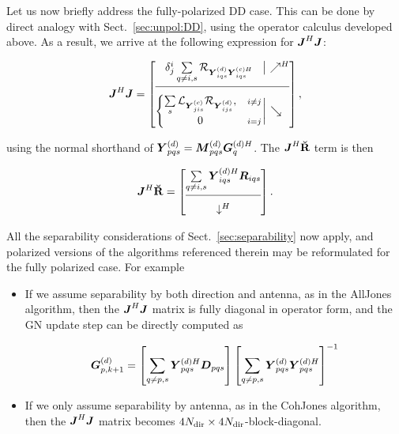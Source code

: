 \documentclass[useAMS,usenatbib]{mn2e}
\newcommand{\mat}[1]{{\bmath{#1}}}
\newcommand{\JJ}{\mat{J}} %
\newcommand{\DD}{\mat{D}}
\newcommand{\RR}{\mat{R}}
\newcommand{\JHJ}{\JJ^H\JJ} %
\begin{document}
Let us now briefly address the fully-polarized DD case. This can be done by direct analogy with
Sect.~\ref{sec:unpol:DD}, using the operator calculus developed above. As a result, we arrive at the
following expression for $\JHJ$:

\begin{equation}
\label{eq:JHJ:DD:pol}
  \JHJ = \JHJblocks{
  \delta^i_j \sum\limits_{q\ne i,s} \Rop{\YYd_{iqs} \YYcH_{iqs}} 
  }{
  \left \{ 
  \begin{array}{@{}cc@{}}
   \sum\limits_{s} \Lop{ \YYc_{jis}  } \Rop{\YYd_{ijs}},&{\scriptstyle i\ne j} \\
   0 &{\scriptstyle i=j}
  \end{array} \right . 
  }
,
\end{equation}

using the normal shorthand of $\YYd_{pqs} = \MMd_{pqs} \GGdH_q$. The $\JJ^H\RRr$ term is then

\newcommand{\CCC}{\mathcal{C}}

\begin{equation}
\label{eq:JHR:DD:pol}
\JJ^H\RRr = \Matrix{c}{
\sum\limits_{q\ne i,s} \YYdH_{iqs} \RR_{iqs} \\
\hline\\[-8pt]
\downarrow^H}.
\end{equation}

All the separability considerations of Sect.~\ref{sec:separability} now apply, and polarized versions of the 
algorithms referenced therein may be reformulated for the fully polarized case. For example

\begin{itemize} 

\item If we assume separability by both direction and antenna, as in the {\sc AllJones} algorithm, then
the $\JHJ$ matrix is fully diagonal in operator form, and the GN update step can be directly computed as

\begin{equation}
\label{eq:update:DD:diag:pol}
\GGd_{p,k+1} = \left [ \sum\limits_{q\ne p,s} \YYdH_{pqs} \DD_{pqs} \right ] 
\left [ \sum\limits_{q\ne p,s} \YYd_{pqs} \YYdH_{pqs}  \right ]^{-1}
\end{equation}

\item If we only assume separability by antenna, as in the {\sc CohJones} algorithm, then the $\JHJ$ matrix 
becomes $4N_\mathrm{dir}\times4N_\mathrm{dir}$-block-diagonal.
\end{itemize}
\end{document}
